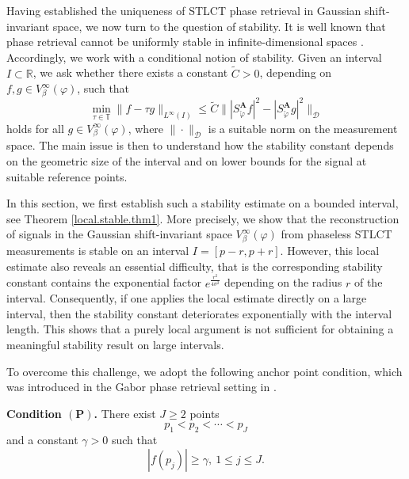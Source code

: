 \documentclass[11pt, reqno]{amsart}
\newcommand{\R}{\mathbb{R}}
\numberwithin{equation}{section}
\begin{document}
Having established the uniqueness of STLCT phase retrieval in Gaussian shift-invariant space, we now turn to the question of stability. It is well known that phase retrieval cannot be uniformly stable in infinite-dimensional spaces \cite{alaifari2017phase,cahill2016phase}.  Accordingly, we work with a conditional notion of stability. Given an interval $I\subset\R$, we ask whether there exists a constant $\widetilde C>0$, depending on $f, g\in V_\beta^\infty(\varphi)$, such that
\begin{equation}\label{stable.eq.general}
\min_{\tau\in\mathbb T}\|f-\tau g\|_{L^\infty(I)}
\le \widetilde C
\bigl\||S_{\check{\varphi}}^{\mathbf A}f|^2-|S_{\check{\varphi}}^{\mathbf A}g|^2\bigr\|_{\mathcal D}%
\end{equation}
holds for all $g\in V_\beta^\infty(\varphi)$, where $\|\cdot\|_{\mathcal D}$ is a suitable norm on the measurement space. The main issue is then to understand how the stability constant depends on the geometric size of the interval and on lower bounds for the signal at suitable reference points. 



In this section, we first establish such a stability estimate on a bounded interval, see Theorem \ref{local.stable.thm1}. More precisely, we show that the reconstruction of signals in the Gaussian shift-invariant space $V_\beta^\infty(\varphi)$ from phaseless STLCT measurements is stable  on an interval $I=[p-r,p+r]$. However, this local estimate also reveals an essential difficulty, that is  the corresponding stability constant contains the exponential factor $e^{\frac{r^2}{4\sigma^2}}$ depending on the radius $r$ of the interval. Consequently, if one applies the local estimate directly on a large interval, then the stability constant deteriorates exponentially with the interval length. This shows that a purely local argument is not sufficient for obtaining a meaningful stability result on large intervals. 


To overcome this challenge, we adopt the following anchor point condition, which was introduced in the Gabor phase retrieval setting in \cite{grohs2024stable}.

\smallskip 
\noindent\textbf{Condition $(\mathbf P)$.} There exist $J\ge 2$ points
$$ p_1<p_2<\cdots<p_J$$
and a constant $\gamma>0$ such that
$$ |f(p_j)|\ge \gamma, \ 1\le j\le J.$$
\end{document}
